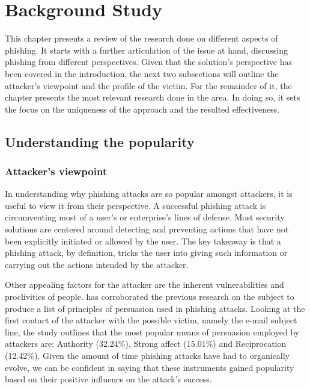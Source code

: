 
\chapter{Background Study}
\label{chap:bgStudy}

This chapter presents a review of the research done on different aspects of phishing. It starts with a further articulation of the issue at hand, discussing phishing from different perspectives. Given that the solution's perspective has been covered in the introduction, the next two subsections will outline the attacker's viewpoint and the profile of the victim. For the remainder of it, the chapter presents the most relevant research done in the area. In doing so, it sets the focus on the uniqueness of the approach and the resulted effectiveness.

\section{Understanding the popularity}

\subsection{Attacker's viewpoint}


In understanding why phishing attacks are so popular amongst attackers, it is useful to view it from their perspective. A successful phishing attack is circumventing most of a user's or enterprise's lines of defense. Most security solutions are centered around detecting and preventing actions that have not been explicitly initiated or allowed by the user. The key takeaway is that a phishing attack, by definition, tricks the user into giving such information or carrying out the actions intended by the attacker.

Other appealing factors for the attacker are the inherent vulnerabilities and proclivities of people. \cite{PRINCIPLES_OF_PERSUASION} has corroborated the previous research on the subject to produce a list of principles of persuasion used in phishing attacks. Looking at the first contact of the attacker with the possible victim, namely the e-mail subject line, the study outlines that the most popular means of persuasion employed by attackers are: Authority (32.24\%), Strong affect (15.01\%) and Reciprocation (12.42\%). Given the amount of time phishing attacks have had to organically evolve, we can be confident in saying that these instruments gained popularity based on their positive influence on the attack's success.

